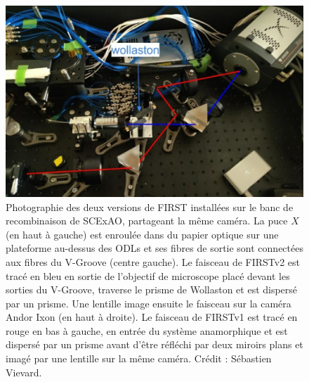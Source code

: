 \begin{figure}[ht!]
    \centering
    \includegraphics[width=\figwidth]{Figure_Chap5/20220201_Subaru_V1V2.jpeg}
    \caption[Photographie des deux versions de FIRST installées sur le banc de recombinaison de SCExAO, partageant la même caméra.]{Photographie des deux versions de FIRST installées sur le banc de recombinaison de SCExAO, partageant la même caméra. La puce $X$ (en haut à gauche) est enroulée dans du papier optique sur une plateforme au-dessus des ODLs et ses fibres de sortie sont connectées aux fibres du V-Groove (centre gauche). Le faisceau de FIRSTv2 est tracé en bleu en sortie de l'objectif de microscope placé devant les sorties du V-Groove, traverse le prisme de Wollaston et est dispersé par un prisme. Une lentille image ensuite le faisceau sur la caméra Andor Ixon (en haut à droite). Le faisceau de FIRSTv1 est tracé en rouge en bas à gauche, en entrée du système anamorphique et est dispersé par un prisme avant d'être réfléchi par deux miroirs plans et imagé par une lentille sur la même caméra. Crédit : Sébastien Vievard.}
    \label{fig:FIRSTV1V2IxonPhoto}
\end{figure}

